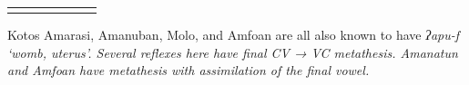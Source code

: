 \begin{table}
\begin{threeparttable}
\begin{tabular}{ll@{}l|ll|l@{}l}
		\lspbottomrule
	\end{tabular}
		\begin{tablenotes}\tnsize
			\item[†]	{Kotos Amarasi, Amanuban, Molo, and Amfo{\Q}an are
								all also known to have \it{ʔapu-f} ‘womb, uterus’.
								Several reflexes here have final CV → VC metathesis.
								Amanatun and Amfo{\Q}an have metathesis with
								assimilation of the final vowel.}
		\end{tablenotes}
	\end{threeparttable}
\end{table}

